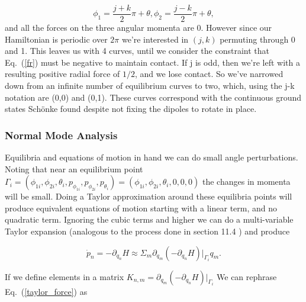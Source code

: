 \documentclass[prbg,preprint]{revtex4-1}
\begin{document}
\begin{subequations}
	\begin{equation}
		\phi_1 = \frac{j+k}{2}\pi +\theta,
	\end{equation}
	\begin{equation}
		\phi_2 = \frac{j-k}{2}\pi +\theta,
	\end{equation}
\end{subequations}
and all the forces on the three angular momenta are 0. However since our Hamiltonian is periodic over $2\pi$ we're interested in $(j,k)$ permuting through 0 and 1. This leaves us with 4 curves, until we consider the constraint that Eq.~(\ref{fr}) must be negative to maintain contact. If j is odd, then we're left with a resulting positive radial force of $1/2$, and we lose contact. So we've narrowed down from an infinite number of equilibrium curves to two, which, using the j-k notation are (0,0) and (0,1). These curves correspond with the continuous ground states Schönke \cite{PhysRevApplied.4.064007} found despite not fixing the dipoles to rotate in place.



\subsubsection{Normal Mode Analysis}
Equilibria and equations of motion in hand we can do small angle perturbations. Noting that near an equilibrium point 
$\Gamma_i = 
(
\phi_{1i},\phi_{2i},\theta_{i},
p_{\phi_{1i}},p_{\phi_{2i}},p_{\theta_{i}}
)
=
(\phi_{1i},\phi_{2i},\theta_{i},0,0,0)
$ 
the changes in momenta will be small. 
Doing a Taylor approximation around these equilibria points will produce equivalent equations of motion starting with a linear term, and no quadratic term. 
Ignoring the cubic terms and higher we can do a multi-variable Taylor expansion (analogous to the process done in section 11.4 \cite{taylor2005classical})  and produce 

\begin{equation}\label{taylor_force}
	\dot p_n 
	=
	-\partial_{q_n}H
	\approx 
	\Sigma_m \partial_{q_m}(-\partial_{q_n} H)|_{\Gamma_i} q_m .
\end{equation}

If we define elements in a matrix 
$K_{n,m}= \partial_{q_m}(-\partial_{q_n} H)|_{\Gamma_i}$
We can rephrase Eq.~(\ref{taylor_force}) as 
\end{document}
